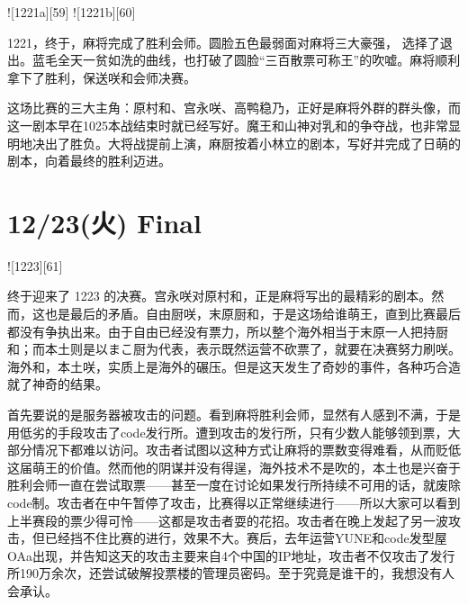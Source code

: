 ![1221a][59]
![1221b][60]

1221，终于，麻将完成了胜利会师。圆脸五色最弱面对麻将三大豪强， 选择了退出。蓝毛全天一贫如洗的曲线，也打破了圆脸“三百散票可称王”的吹嘘。麻将顺利拿下了胜利，保送咲和会师决赛。

这场比赛的三大主角：原村和、宫永咲、高鸭稳乃，正好是麻将外群的群头像，而这一剧本早在1025本战结束时就已经写好。魔王和山神对乳和的争夺战，也非常显明地决出了胜负。大将战提前上演，麻厨按着小林立的剧本，写好并完成了日萌的剧本，向着最终的胜利迈进。

\section{12/23(火) Final}


![1223][61]

终于迎来了 1223 的决赛。宫永咲对原村和，正是麻将写出的最精彩的剧本。然而，这也是最后的矛盾。自由厨咲，末原厨和，于是这场给谁萌王，直到比赛最后都没有争执出来。由于自由已经没有票力，所以整个海外相当于末原一人把持厨和；而本土则是以まこ厨为代表，表示既然运营不砍票了，就要在决赛努力刷咲。海外和，本土咲，实质上是海外的碾压。但是这天发生了奇妙的事件，各种巧合造就了神奇的结果。

首先要说的是服务器被攻击的问题。看到麻将胜利会师，显然有人感到不满，于是用低劣的手段攻击了code发行所。遭到攻击的发行所，只有少数人能够领到票，大部分情况下都难以访问。攻击者试图以这种方式让麻将的票数变得难看，从而贬低这届萌王的价值。然而他的阴谋并没有得逞，海外技术不是吹的，本土也是兴奋于胜利会师一直在尝试取票——甚至一度在讨论如果发行所持续不可用的话，就废除code制。攻击者在中午暂停了攻击，比赛得以正常继续进行——所以大家可以看到上半赛段的票少得可怜——这都是攻击者耍的花招。攻击者在晚上发起了另一波攻击，但已经挡不住比赛的进行，效果不大。赛后，去年运营YUNE和code发型屋OAa出现，并告知这天的攻击主要来自4个中国的IP地址，攻击者不仅攻击了发行所190万余次，还尝试破解投票楼的管理员密码。至于究竟是谁干的，我想没有人会承认。

